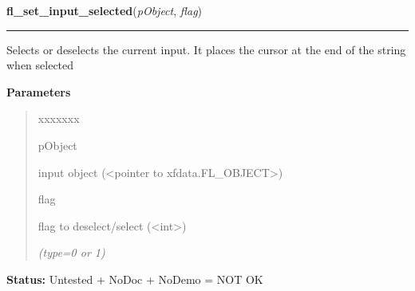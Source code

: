 \hspace{.8\funcindent}\begin{boxedminipage}{\funcwidth}

    \raggedright \textbf{fl\_set\_input\_selected}(\textit{pObject}, \textit{flag})

    \vspace{-1.5ex}

    \rule{\textwidth}{0.5\fboxrule}
\setlength{\parskip}{2ex}
    Selects or deselects the current input. It places the cursor at the end
    of the string when selected

\setlength{\parskip}{1ex}
      \textbf{Parameters}
      \vspace{-1ex}

      \begin{quote}
        \begin{Ventry}{xxxxxxx}

          \item[pObject]

          input object ({\textless}pointer to 
          xfdata.FL\_OBJECT{\textgreater})

          \item[flag]

          flag to deselect/select ({\textless}int{\textgreater})

            {\it (type=0 or 1)}

        \end{Ventry}

      \end{quote}

\textbf{Status:} Untested + NoDoc + NoDemo = NOT OK



    \end{boxedminipage}

    \label{xformslib:library:fl_set_input_selected_range}

    \vspace{0.5ex}

